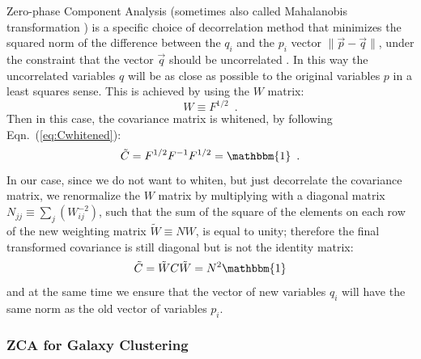 Zero-phase Component Analysis (sometimes also called Mahalanobis transformation \cite{kessy_optimal_2015}) is a specific choice of decorrelation method that 
minimizes the squared norm of the difference between the $q_i$
and the $p_i$ vector $\|\vec{p}-\vec{q}\|$, under the constraint that the vector $\vec{q}$ should be uncorrelated \cite{kessy_optimal_2015}. 
In this way the uncorrelated variables $q$ will be as close 
as possible to the original variables $p$ in a least squares sense. 
This is achieved by using the $W$ matrix:
\begin{equation}
W \equiv F^{1/2} \,\,\, .
\end{equation}
Then in this case, the covariance matrix is whitened, by following Eqn.\ (\ref{eq:Cwhitened}):
\begin{equation}
\tilde{C} =F^{1/2}F^{-1}F^{1/2}=\mathbbm{1} \,\,\, .
\end{equation}
In our case, since we do not want to whiten, but just decorrelate the covariance matrix,
we renormalize the $W$ matrix by multiplying with a diagonal matrix $N_{jj}\equiv\sum_j(W_{ij}^{-2})$, such that the sum of the square of the 
elements on each row of the new weighting matrix 
$\tilde{W} \equiv N W$, is equal to unity; therefore the final
transformed covariance is still diagonal but is not the identity matrix: 
\begin{equation}
\tilde{C}=\tilde{W}C\tilde{W}=N^{2} \mathbbm{1} \label{eq:Ctilde-decor}
\end{equation}
and at the same time we ensure that 
the vector of new variables $q_i$ will have the same norm as the old vector of variables $p_i$.

\subsubsection{ZCA for Galaxy Clustering \label{subsub:ZCA-GC}}


